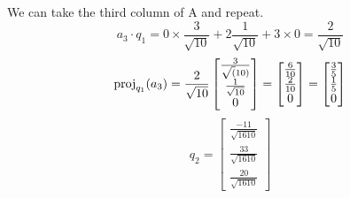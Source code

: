\documentclass[12pt]{article}
\begin{document}
\begin{enumerate}[leftmargin=0em]
        We can take the third column of A  and repeat.
        \[ a_3 \cdot q_1 = 0 \times \frac{3}{\sqrt{10}} + 2 \frac{1}{\sqrt{10}} + 3 \times 0 = \frac{2}{\sqrt{10}}\]
        \[\operatorname{proj}_{q_1}(a_3)=\frac{2}{\sqrt{10}} \begin{bmatrix}
            \frac{3}{\sqrt(10)} \\
            \frac{1}{\sqrt{10}} \\
            0
        \end{bmatrix} = \begin{bmatrix}
            \frac{6}{10} \\
            \frac{2}{10} \\
            0
        \end{bmatrix} =   \begin{bmatrix}
            \frac{3}{5} \\
            \frac{1}{5} \\
            0
        \end{bmatrix} \]
        \[
            q_2 = \begin{bmatrix}
                \frac{-11}{\sqrt{1610}} \\
                \frac{33}{\sqrt{1610}} \\
                \frac{20}{\sqrt{1610}}
            \end{bmatrix}\]


\end{enumerate}
\end{document}

